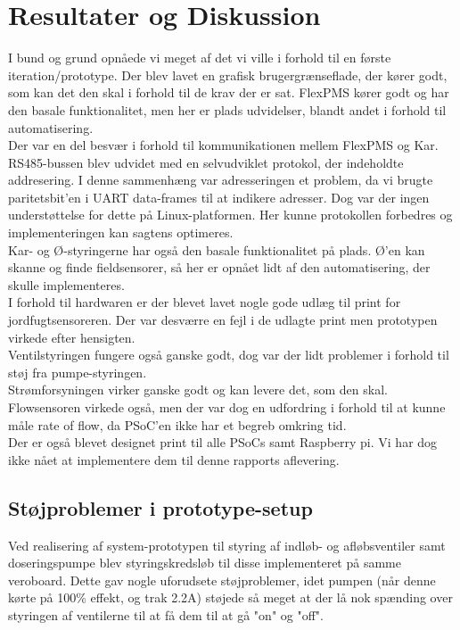 \section{Resultater og Diskussion}
I bund og grund opnåede vi meget af det vi ville i forhold til en første iteration/prototype. Der blev lavet en grafisk brugergrænseflade, der kører godt, som kan det den skal i forhold til de krav der er sat. FlexPMS kører godt og har den basale funktionalitet, men her er plads udvidelser, blandt andet i forhold til automatisering.\\
Der var en del besvær i forhold til kommunikationen mellem FlexPMS og Kar. RS485-bussen blev udvidet med en selvudviklet protokol, der indeholdte addresering. I denne sammenhæng var adresseringen et problem, da vi brugte paritetsbit'en i UART data-frames til at indikere adresser. Dog var der ingen understøttelse for dette på Linux-platformen. Her kunne protokollen forbedres og implementeringen kan sagtens optimeres.\\
Kar- og Ø-styringerne har også den basale funktionalitet på plads. Ø'en kan skanne og finde fieldsensorer, så her er opnået lidt af den automatisering, der skulle implementeres.\\
I forhold til hardwaren er der blevet lavet nogle gode udlæg til print for jordfugtsensoreren. Der var desværre en fejl i de udlagte print men prototypen virkede efter hensigten. \\
Ventilstyringen fungere også ganske godt, dog var der lidt problemer i forhold til støj fra pumpe-styringen.\\
Strømforsyningen virker ganske godt og kan levere det, som den skal. \\
Flowsensoren virkede også, men der var dog en udfordring i forhold til at kunne måle rate of flow, da PSoC'en ikke har et begreb omkring tid.\\
Der er også blevet designet print til alle PSoCs samt Raspberry pi. Vi har dog ikke nået at implementere dem til denne rapports aflevering.
   

\subsection{Støjproblemer i prototype-setup}

Ved realisering af system-prototypen til styring af indløb- og afløbsventiler samt doseringspumpe blev styringskredsløb til disse implementeret på samme veroboard. 
Dette gav nogle uforudsete støjproblemer, idet pumpen (når denne kørte på 100\% effekt, og trak 2.2A) støjede så meget at der lå nok spænding over styringen af ventilerne til at få dem til at gå "on" og "off".\newline

